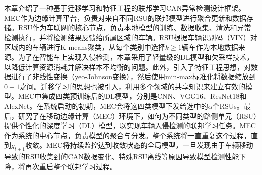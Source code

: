 本章介绍了一种基于迁移学习和特征工程的联邦学习CAN异常检测设计框架。MEC作为边缘计算平台，负责对来自不同RSU的联邦模型进行聚合更新和数据存储。RSU作为车联网的核心节点，负责本地模型的训练、数据收集、清洗和异常检测执行，并将检测结果反馈给所属区域的车辆。RSU根据车辆识别码（VIN）对区域内的车辆进行K-means聚类，从每个类别中选择$k \geq 1$辆车作为本地数据来源。为了在智能车上实现入侵检测，本章采用了轻量级的DL模型和欠采样技术，以降低计算资源消耗并解决样本不均衡的问题。此外，引入了特征工程思想，对数据进行了非线性变换（yeo-Johnson变换），然后使用min-max标准化将数据缩放到$0-1$之间。迁移学习的思想也被引入，利用多个领域的共享知识来建立有效的模型。MEC中集成四类预训练后的DL模型，分别是CNN、VGG16、ResNet18和AlexNet。在系统启动的初期，MEC会将这四类模型下发给选中的$\alpha$个RSUs。最后，研究了在移动边缘计算（MEC）环境下，如何为不同类型的路侧单元（RSU）提供个性化的深度学习（DL）模型，以实现车辆入侵检测的联邦学习任务。MEC作为系统的中心节点，负责模型的聚合与分发。整个系统将一直重复这个过程，直到$g_{t+1}$收敛。MEC将持续监控达到收敛状态的全局模型，一旦发现由于车辆移动导致的RSU收集到的CAN数据变化、特殊RSU离线等原因导致模型检测性能下降，将再次重启整个联邦学习过程。

